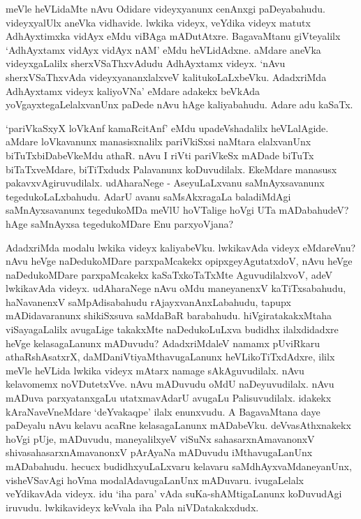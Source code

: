 meVle heVLidaMte nAvu Odidare videyxyanunx cenAnxgi paDeyabahudu. videyxyalUlx aneVka vidhavide. lwkika videyx, veYdika videyx matutx 
AdhAyxtimxka vidAyx eMdu viBAga mADutAtxre. BagavaMtanu giVteyalilx `AdhAyxtamx vidAyx vidAyx nAM' eMdu heVLidAdxne. aMdare aneVka 
videyxgaLalilx sherxVSaThxvAdudu AdhAyxtamx videyx. `nAvu sherxVSaThxvAda videyxyananxlalxveV kalitukoLaLxbeVku. AdadxriMda AdhAyxtamx videyx kaliyoVNa' 
eMdare adakekx beVkAda yoVgayxtegaLelalxvanUnx paDede nAvu hAge kaliyabahudu. Adare adu kaSaTx.

`pariVkaSxyX loVkAnf kamaRcitAnf' eMdu upadeVshadalilx heVLalAgide. aMdare loVkavanunx manasisxnalilx pariVkiSxsi naMtara elalxvanUnx biTuTxbiDabeVkeMdu athaR. 
nAvu I riVti pariVkeSx mADade biTuTx biTaTxveMdare, biTiTxdudx Palavanunx koDuvudilalx. EkeMdare manasusx pakavxvAgiruvudilalx. udAharaNege - AseyuLaLxvanu 
saMnAyxsavanunx tegedukoLaLxbahudu. AdarU avanu saMsAkxragaLa baladiMdAgi saMnAyxsavanunx tegedukoMDa 
meVlU hoVTalige hoVgi UTa mADabahudeV? hAge saMnAyxsa tegedukoMDare Enu parxyoVjana?

AdadxriMda modalu lwkika videyx kaliyabeVku. lwkikavAda videyx eMdareVnu? nAvu heVge naDedukoMDare parxpaMcakekx opipxgeyAgutatxdoV, nAvu 
heVge naDedukoMDare parxpaMcakekx kaSaTxkoTaTxMte AguvudilalxvoV, adeV lwkikavAda videyx. udAharaNege nAvu oMdu maneyanenxV kaTiTxsabahudu, 
haNavanenxV saMpAdisabahudu rAjayxvanAnxLabahudu, tapupx mADidavaranunx shikiSxsuva saMdaBaR barabahudu. hiVgiratakakxMtaha viSayagaLalilx 
avugaLige takakxMte naDedukoLuLxva budidhx ilalxdidadxre heVge kelasagaLanunx mADuvudu? AdadxriMdaleV namamx pUviRkaru athaRshAsatxrX, 
daMDaniVtiyaMthavugaLanunx heVLikoTiTxdAdxre, ililx meVle heVLida lwkika videyx mAtarx namage sAkAguvudilalx. nAvu kelavomemx 
noVDutetxVve. nAvu mADuvudu oMdU naDeyuvudilalx. nAvu mADuva parxyatanxgaLu utatxmavAdarU avugaLu Palisuvudilalx. idakekx 
kAraNaveVneMdare `deYvakaqpe' ilalx enunxvudu. A BagavaMtana daye paDeyalu nAvu kelavu acaRne kelasagaLanunx mADabeVku. deVvasAthxnakekx 
hoVgi pUje, mADuvudu, maneyalilxyeV viSuNx sahasarxnAmavanonxV shivasahasarxnAmavanonxV pArAyaNa mADuvudu iMthavugaLanUnx 
mADabahudu. hecucx budidhxyuLaLxvaru kelavaru saMdhAyxvaMdaneyanUnx, visheVSavAgi hoVma modalAdavugaLanUnx mADuvaru. 
ivugaLelalx veYdikavAda videyx. idu `iha para' vAda suKa-shAMtigaLanunx koDuvudAgi iruvudu. lwkikavideyx keVvala iha Pala niVDatakakxdudx.


